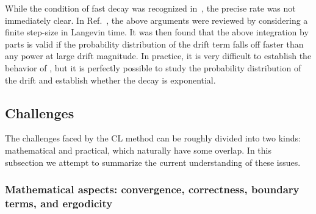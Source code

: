 \documentclass[../main.tex]{subfiles}
\begin{document}
While the condition of fast decay was recognized in~\cite{AartsPRD81054508, 2011EurPhysJC711756},
the precise rate was not immediately clear. In Ref.~\cite{CLJustificationPRD94114515}, the above arguments were
reviewed by considering a finite step-size in Langevin time. It was then found that the above integration by parts is
valid if the probability distribution of the drift term falls off faster than any power at large drift magnitude.
In practice, it is very difficult to establish the behavior of , but it is perfectly possible to study
the probability distribution of the drift and establish whether the decay is exponential.



\subsection{\label{sect:CLchallenges}Challenges}

The challenges faced by the CL method can be roughly divided into two kinds: mathematical and practical, which
naturally have some overlap. In this subsection we attempt to summarize the current understanding of these issues.

\subsubsection{Mathematical aspects: convergence, correctness, boundary terms, and ergodicity}
\end{document}
